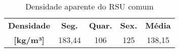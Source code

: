 \begin{table}[htbp]
	\centering
	\caption{Densidade aparente do RSU comum}
	\begin{tabular}{c|c|c|c|c}
		\rowcolor[rgb]{ .969,  .588,  .275} \textcolor[rgb]{ 1,  1,  1}{\textbf{Densidade}} & \textcolor[rgb]{ 1,  1,  1}{\textbf{Seg.}} & \textcolor[rgb]{ 1,  1,  1}{\textbf{Quar.}} & \textcolor[rgb]{ 1,  1,  1}{\textbf{Sex.}} & \textcolor[rgb]{ 1,  1,  1}{\textbf{Média}} \\
		\rowcolor[rgb]{ .969,  .588,  .275} \textcolor[rgb]{ 1,  1,  1}{\textbf{[kg/m³]}} & \cellcolor[rgb]{ .984,  .831,  .706}183,44 & \cellcolor[rgb]{ .984,  .831,  .706}106 & \cellcolor[rgb]{ .984,  .831,  .706}125 & \cellcolor[rgb]{ .984,  .831,  .706}138,15 \\
	\end{tabular}%
	\label{tab:densidade_aparente}%
\end{table}%
